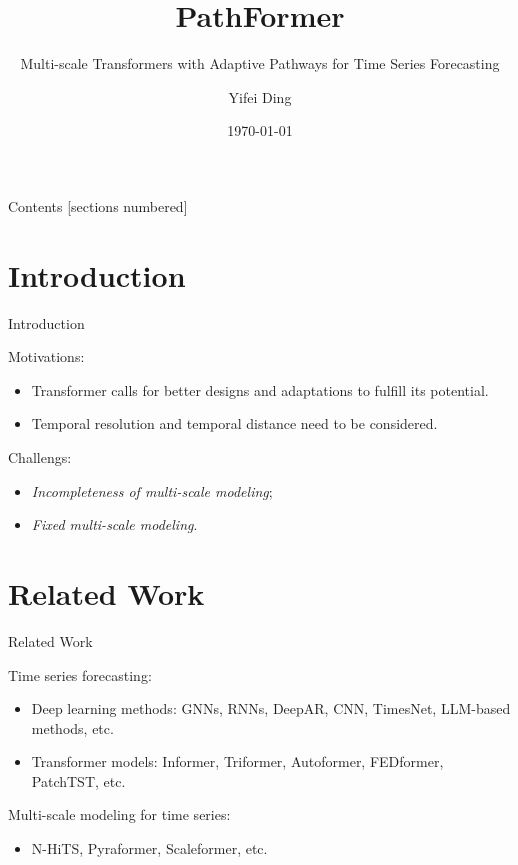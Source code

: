 \documentclass[12pt,aspectratio=169]{beamer}
\title{PathFormer}
\subtitle{Multi-scale Transformers with Adaptive Pathways for Time Series Forecasting}
\date{\today}
\author{Yifei Ding}
\begin{document}
\maketitle
\begin{frame}{Contents}
  [sections numbered]
  \tableofcontents%
\end{frame}


\section{Introduction}

\begin{frame}{Introduction}

  Motivations:

  \begin{itemize}

  	\item Transformer calls for better designs and adaptations to fulfill 
    its potential.
  
  	\item Temporal resolution and temporal distance need to be considered.

  \end{itemize}

  Challengs:

  \begin{itemize}

	\item \textit{Incompleteness of multi-scale modeling};
	\item \textit{Fixed multi-scale modeling}.

  \end{itemize}

\end{frame}

\section{Related Work}

\begin{frame}{Related Work}

  Time series forecasting:

  \begin{itemize}

    \item Deep learning methods: GNNs, RNNs, DeepAR, CNN, TimesNet, 
    LLM-based methods, etc.
    \item Transformer models: Informer, Triformer, Autoformer, FEDformer, 
    PatchTST, etc.

  \end{itemize}

  Multi-scale modeling for time series:

  \begin{itemize}

    \item N-HiTS, Pyraformer, Scaleformer, etc.

  \end{itemize}

\end{frame}
\end{document}
